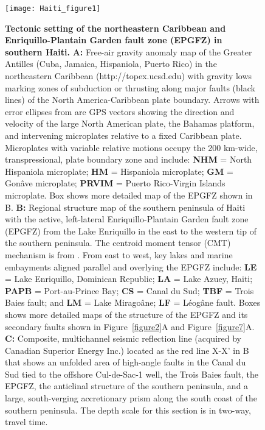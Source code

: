 \documentclass[linenumbers,draft]{agujournal}
\begin{document}
\clearpage

\begin{figure}
\centering
\texttt{[image: Haiti\_figure1]}
\caption{\textbf{Tectonic setting of the northeastern Caribbean and Enriquillo-Plantain Garden fault zone (EPGFZ) in southern Haiti.} \textbf{A:}
Free-air gravity anomaly map of the Greater Antilles (Cuba, Jamaica, Hispaniola, Puerto Rico) in the northeastern Caribbean (http://topex.ucsd.edu) with gravity lows marking zones of subduction or thrusting along major faults (black lines) of the North America-Caribbean plate boundary. Arrows with error ellipses from \citet{calais2010transpressional} are GPS vectors showing the direction and velocity of the large North American plate, the Bahamas platform, and intervening microplates relative to a fixed Caribbean plate. Microplates with variable relative motions occupy the 200 km-wide, transpressional, plate boundary zone and include: \textbf{NHM} = North Hispaniola microplate; \textbf{HM} = Hispaniola microplate; \textbf{GM} = Gon\^ave microplate; \textbf{PRVIM} = Puerto Rico-Virgin Islands microplate. Box shows more detailed map of the EPGFZ shown in B. \textbf{B:} Regional structure map of the southern peninsula of Haiti with the active, left-lateral Enriquillo-Plantain Garden fault zone (EPGFZ) from the Lake Enriquillo in the east to the western tip of the southern peninsula. The centroid moment tensor (CMT) mechanism is from \citet{douilly2013crustal}. From east to west, key lakes and marine embayments aligned parallel and overlying the EPGFZ include: \textbf{LE} = Lake Enriquillo, Dominican Republic; \textbf{LA} = Lake Azuey, Haiti; \textbf{PAPB} = Port-au-Prince Bay; \textbf{CS }= Canal du Sud; \textbf{TBF }= Trois Baies fault; and \textbf{LM} = Lake Mirago\^ane; \textbf{LF} = L\'eog\^ane fault. Boxes shows more detailed maps of the structure of the EPGFZ and its secondary faults shown in Figure~\ref{figure2}A and Figure~\ref{figure7}A. \textbf{C:} Composite, multichannel seismic reflection line (acquired by Canadian Superior Energy Inc.) located as the red line X-X' in B that shows an unfolded area of high-angle faults in the Canal du Sud tied to the offshore Cul-de-Sac-1 well, the Trois Baies fault, the EPGFZ, the anticlinal structure of the southern peninsula, and a large, south-verging accretionary prism along the south coast of the southern peninsula. The depth scale for this section is in two-way, travel time.}
\label{figure1}
\end{figure}
\end{document}
